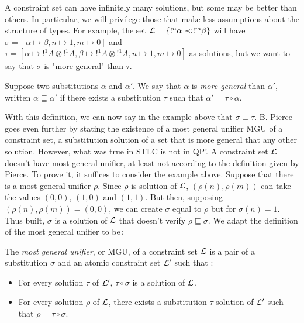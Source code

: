 A constraint set can have infinitely many solutions, but some may be better than others. In particular, we will privilege those
that make less assumptions about the structure of types. For example, the set $\mathcal{L} = \{!^n \alpha \prec: !^m \beta\}$ will have
$\sigma = [\alpha \mapsto \beta, n \mapsto 1, m \mapsto 0]$ and $\tau = [\alpha \mapsto !^1 A \otimes !^1 A, \beta \mapsto !^1 A \otimes !^1 A,
n \mapsto 1, m \mapsto 0]$ as solutions, but we want to say that $\sigma$ is "more general" than $\tau$.

\begin{defn} Suppose two substitutions $\alpha$ and $\alpha'$. We say that $\alpha$ is \textit{more general} than $\alpha'$, written
	$\alpha \sqsubseteq \alpha'$ if there exists a substitution $\tau$ such that $\alpha' = \tau \circ \alpha$.
\end{defn}

With this definition, we can now say in the example above that $\sigma \sqsubseteq \tau$. B. Pierce goes even further by stating the existence
of a most general unifier MGU of a constraint set, a substitution solution of a set that is more general that any other solution. However,
what was true in STLC is not in QP'. A constraint set $\mathcal{L}$ doesn't have  most general unifier, at least not according to the definition given
by Pierce. To prove it, it suffices to consider the example above. Suppose that there is a most general unifier $\rho$. Since $\rho$ is
solution of $\mathcal{L}$, $(\rho(n), \rho(m))$ can take the values $(0, 0)$, $(1, 0)$ and $(1, 1)$. But then, supposing $(\rho(n), \rho(m)) = (0, 0)$,
we can create $\sigma$ equal to $\rho$ but for $\sigma(n) = 1$. Thus built, $\sigma$ is a solution of $\mathcal{L}$ that doesn't verify
$\rho \sqsubseteq \sigma$.
We adapt the definition of the most general unifier to be\,:

\begin{defn} The \textit{most general unifier}, or MGU, of a constraint set $\mathcal{L}$ is a pair of a substitution $\sigma$ and an atomic
	constraint set $\mathcal{L}'$ such that :
		\begin{itemize}
			\item For every solution $\tau$ of $\mathcal{L}	'$, $\tau \circ \sigma$ is a solution of $\mathcal{L}$.
			\item For every solution $\rho$ of $\mathcal{L}$, there exists a substitution $\tau$ solution of $\mathcal{L}'$ such that $\rho = \tau \circ \sigma$.
		\end{itemize}
\end{defn}

